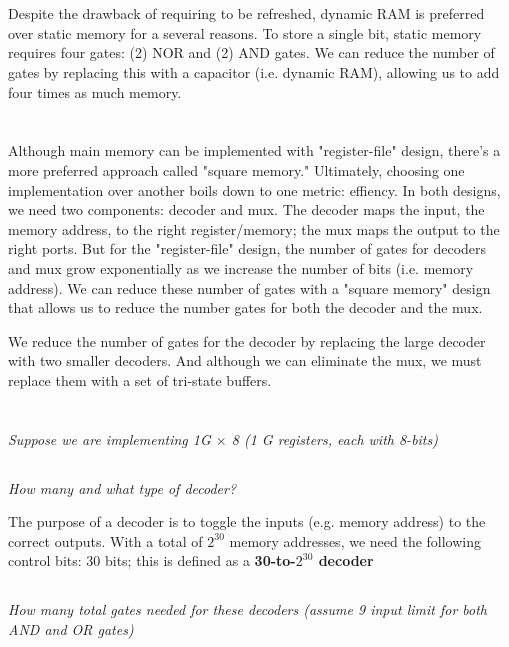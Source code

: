 \documentclass{article}
\begin{document}
\section{}
Despite the drawback of requiring to be refreshed, dynamic RAM is preferred over static memory for a several reasons. To store a single bit, static memory requires four gates: (2) NOR and (2) AND gates. We can reduce the number of gates by replacing this with a capacitor (i.e. dynamic RAM), allowing us to add four times as much memory.
\section{}

Although main memory can be implemented with "register-file" design, there's a more preferred approach called "square memory." Ultimately, choosing one implementation over another boils down to one metric: effiency.  In both designs, we need two components: decoder and mux. The decoder maps the input, the memory address, to the right register/memory; the mux maps the output to the right ports. But for the "register-file" design, the number of gates for decoders and mux grow exponentially as we increase the number of bits (i.e. memory address). We can reduce these number of gates with a "square memory" design that allows us to reduce the number gates for both the decoder and the mux.

We reduce the number of gates for the decoder by replacing the large decoder with two smaller decoders. And although we can eliminate the mux, we must replace them with a set of tri-state buffers.

\section{}
\textit{Suppose we are implementing 1G $\times$ 8 (1 G registers, each with 8-bits)}

\subsection{}
\textit{How many and what type of decoder?}

The purpose of a decoder is to toggle the inputs (e.g. memory address) to the correct outputs. With a total of $2^{30}$ memory addresses, we need the following control bits: 30 bits; this is defined as a \textbf{30-to-$2^{30}$ decoder}

\subsection{}
\textit{How many total gates needed for these decoders (assume 9 input limit for both AND and OR gates)}
\end{document}
